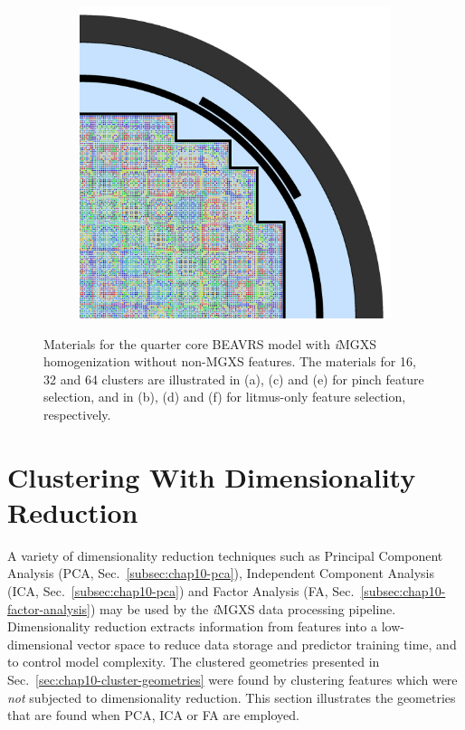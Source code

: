 \begin{appendices}
\begin{figure}[h!]
\begin{subfigure}{0.48\textwidth}
  \caption{}
  \label{fig:no-features-full-core-pinch-64}
\end{subfigure}%
\begin{subfigure}{0.48\textwidth}
  \centering
  \includegraphics[width=0.85\linewidth]{figures/unsupervised/geometries/without-features/64-clusters/combined/full-core}
  \caption{}
  \label{fig:no-features-full-core-combined-64}
\end{subfigure}
\caption[Clustered geometries without non-MGXS features]{Materials for the quarter core \ac{BEAVRS} model with \textit{i}\ac{MGXS} homogenization without non-\ac{MGXS} features. The materials for 16, 32 and 64 clusters are illustrated in (a), (c) and (e) for pinch feature selection, and in (b), (d) and (f) for litmus-only feature selection, respectively.}
\label{fig:no-features-full-core-geometries-64}
\end{figure}

\clearpage


\section{Clustering With Dimensionality Reduction}
\label{sec:clustering-with-dimension-reduce}

A variety of dimensionality reduction techniques such as Principal Component Analysis (PCA, Sec.~\ref{subsec:chap10-pca}), Independent Component Analysis (ICA, Sec.~\ref{subsec:chap10-pca}) and Factor Analysis (FA, Sec.~\ref{subsec:chap10-factor-analysis}) may be used by the \textit{i}\ac{MGXS} data processing pipeline. Dimensionality reduction extracts information from features into a low-dimensional vector space to reduce data storage and predictor training time, and to control model complexity. The clustered geometries presented in Sec.~\ref{sec:chap10-cluster-geometries} were found by clustering features which were \textit{not} subjected to dimensionality reduction. This section illustrates the geometries that are found when PCA, ICA or FA are employed.


\end{appendices}
